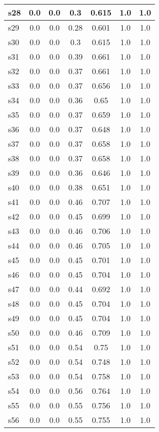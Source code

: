 \documentclass{article}
\begin{document}
\begin{tabular}{|l|c|c|c|c|c|c|}
\hline
s28 &0.0 & 0.0 & 0.3 & 0.615 & 1.0 & 1.0\\
\hline
s29 &0.0 & 0.0 & 0.28 & 0.601 & 1.0 & 1.0\\
\hline
s30 &0.0 & 0.0 & 0.3 & 0.615 & 1.0 & 1.0\\
\hline
s31 &0.0 & 0.0 & 0.39 & 0.661 & 1.0 & 1.0\\
\hline
s32 &0.0 & 0.0 & 0.37 & 0.661 & 1.0 & 1.0\\
\hline
s33 &0.0 & 0.0 & 0.37 & 0.656 & 1.0 & 1.0\\
\hline
s34 &0.0 & 0.0 & 0.36 & 0.65 & 1.0 & 1.0\\
\hline
s35 &0.0 & 0.0 & 0.37 & 0.659 & 1.0 & 1.0\\
\hline
s36 &0.0 & 0.0 & 0.37 & 0.648 & 1.0 & 1.0\\
\hline
s37 &0.0 & 0.0 & 0.37 & 0.658 & 1.0 & 1.0\\
\hline
s38 &0.0 & 0.0 & 0.37 & 0.658 & 1.0 & 1.0\\
\hline
s39 &0.0 & 0.0 & 0.36 & 0.646 & 1.0 & 1.0\\
\hline
s40 &0.0 & 0.0 & 0.38 & 0.651 & 1.0 & 1.0\\
\hline
s41 &0.0 & 0.0 & 0.46 & 0.707 & 1.0 & 1.0\\
\hline
s42 &0.0 & 0.0 & 0.45 & 0.699 & 1.0 & 1.0\\
\hline
s43 &0.0 & 0.0 & 0.46 & 0.706 & 1.0 & 1.0\\
\hline
s44 &0.0 & 0.0 & 0.46 & 0.705 & 1.0 & 1.0\\
\hline
s45 &0.0 & 0.0 & 0.45 & 0.701 & 1.0 & 1.0\\
\hline
s46 &0.0 & 0.0 & 0.45 & 0.704 & 1.0 & 1.0\\
\hline
s47 &0.0 & 0.0 & 0.44 & 0.692 & 1.0 & 1.0\\
\hline
s48 &0.0 & 0.0 & 0.45 & 0.704 & 1.0 & 1.0\\
\hline
s49 &0.0 & 0.0 & 0.45 & 0.704 & 1.0 & 1.0\\
\hline
s50 &0.0 & 0.0 & 0.46 & 0.709 & 1.0 & 1.0\\
\hline
s51 &0.0 & 0.0 & 0.54 & 0.75 & 1.0 & 1.0\\
\hline
s52 &0.0 & 0.0 & 0.54 & 0.748 & 1.0 & 1.0\\
\hline
s53 &0.0 & 0.0 & 0.54 & 0.758 & 1.0 & 1.0\\
\hline
s54 &0.0 & 0.0 & 0.56 & 0.764 & 1.0 & 1.0\\
\hline
s55 &0.0 & 0.0 & 0.55 & 0.756 & 1.0 & 1.0\\
\hline
s56 &0.0 & 0.0 & 0.55 & 0.755 & 1.0 & 1.0\\

\end{tabular}
\end{document}
